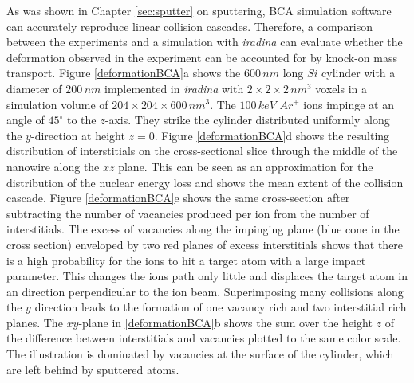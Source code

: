 As was shown in Chapter \ref{sec:sputter} on sputtering, BCA simulation software can accurately reproduce linear collision cascades. Therefore, a comparison between the experiments and a simulation with \emph{iradina} can evaluate whether the deformation observed in the experiment can be accounted for by knock-on mass transport. Figure \ref{deformationBCA}a shows the $600\,nm$ long $Si$ cylinder with a diameter of $200\,nm$ implemented in \emph{iradina} with $2\times2\times2\,nm^3$ voxels in a simulation volume of $204\times204\times600\,nm^3$. The $100\,keV\,\,Ar^+$ ions impinge at an angle of $45^\circ$ to the $z$-axis. They strike the cylinder distributed uniformly along the $y$-direction at height $z=0$. Figure \ref{deformationBCA}d shows the resulting distribution of interstitials on the cross-sectional slice through the middle of the nanowire along the $xz$ plane. This can be seen as an approximation for the distribution of the nuclear energy loss and shows the mean extent of the collision cascade. Figure \ref{deformationBCA}e shows the same cross-section after subtracting the number of vacancies produced per ion from the number of interstitials. The excess of vacancies along the impinging plane (blue cone in the cross section) enveloped by two red planes of excess interstitials shows that there is a high probability for the ions to hit a target atom with a large impact parameter. This changes the ions path only little and displaces the target atom in an direction perpendicular to the ion beam. Superimposing many collisions along the $y$ direction leads to the formation of one vacancy rich and two interstitial rich planes. The $xy$-plane in \ref{deformationBCA}b shows the sum over the height $z$ of the difference between interstitials and vacancies plotted to the same color scale. The illustration is dominated by vacancies at the surface of the cylinder, which are left behind by sputtered atoms. 

